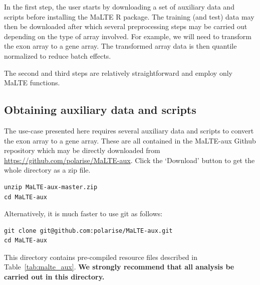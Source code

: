 \documentclass[a4paper,12pt]{article}
\begin{document}
In the first step, the user starts by downloading a set of auxiliary data and scripts before installing the \textsf{MaLTE} \textsf{R} package. The training (and test) data may then be downloaded after which several preprocessing steps may be carried out depending on the type of array involved. For example, we will need to transform the exon array to a gene array. The transformed array data is then quantile normalized to reduce batch effects.

The second and third steps are relatively straightforward and employ only \textsf{MaLTE} functions.

\subsection{Obtaining auxiliary data and scripts}

The use-case presented here requires several auxiliary data and scripts to convert the exon array to a gene array. These are all contained in the \textsf{MaLTE-aux} Github repository which may be directly downloaded from \url{https://github.com/polarise/MaLTE-aux}. Click the `Download' button  to get the whole directory as a zip file.

\begin{verbatim}
unzip MaLTE-aux-master.zip
cd MaLTE-aux
\end{verbatim}

Alternatively, it is much faster to use \textsf{git} as follows: 

\begin{verbatim}
git clone git@github.com:polarise/MaLTE-aux.git
cd MaLTE-aux
\end{verbatim}

This directory contains pre-compiled resource files described in Table~\ref{tab:malte_aux}. \textbf{We strongly recommend that all analysis be carried out in this directory.}
\end{document}
